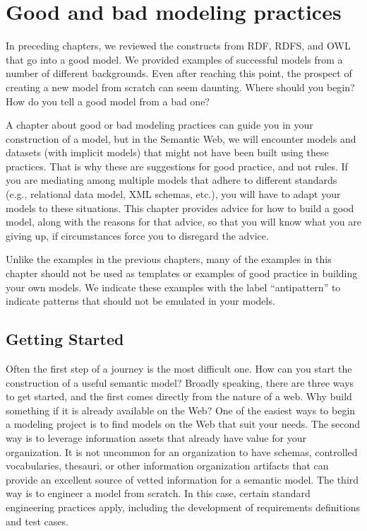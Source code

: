 \chapter{Good and bad modeling practices}
\label {ch15}

In preceding chapters, we reviewed the constructs from RDF, RDFS, and
OWL that go into a good model. We provided examples of successful models
from a number of different backgrounds. Even after reaching this point,
the prospect of creating a new model from scratch can seem daunting.
Where should you begin? How do you tell a good model from a bad one?

A chapter about good or bad modeling practices can guide you in your construction
of a model, but in the Semantic Web, we will encounter models and datasets (with implicit models)
that might not have been built using these practices.  That is why these are suggestions
for good practice, and not rules.  If you are mediating among multiple models
that adhere to different standards (e.g., relational data model, XML schemas, etc.), 
you will have to adapt your models to these situations.  This chapter provides
advice for how to build a good model, along with the reasons for that advice, so that
you will know what you are giving up, if circumstances force you to disregard the
advice. 

Unlike the examples in the previous chapters, many of the examples in
this chapter should not be
used as templates or examples of good practice in building your own
models. We indicate these examples with the label ``antipattern'' to
indicate patterns that should not be emulated in your models.


\section{Getting Started}

Often the first step of a journey is the most difficult one. How can you
start the construction of a useful semantic model? Broadly speaking,
there are three ways to get started, and the first comes directly from
the nature of a web. Why build something if it is already available on
the Web? One of the easiest ways to begin a modeling project is to find
models on the Web that suit your needs. The second way is to leverage
information assets that already have value for your organization.
It is not uncommon for an organization to have schemas, controlled
vocabularies, thesauri, or other information organization artifacts that
can provide an excellent source of vetted information
for a semantic model. The third way is to engineer a model from scratch.
In this case, certain standard engineering practices apply, including
the development of requirements definitions and test cases.

